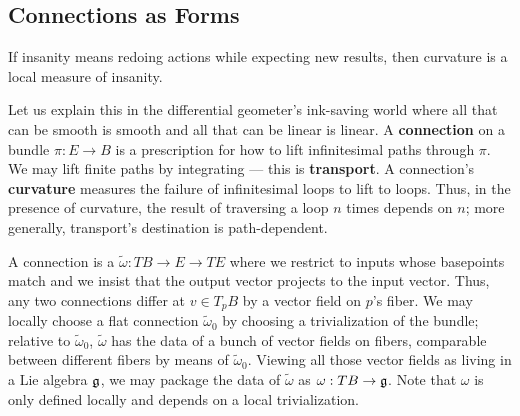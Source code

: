 \documentclass[twocolumn, 11pt]{article}
\newcommand{\gG}{\frak{g}}
\theoremstyle{definition}
\newcommand{\msec}[1]{\subsection*{\color{mblu}\textsf{#1}}}
\begin{document}

    \msec{Connections as Forms}
        If insanity means redoing actions while expecting new results, then
        curvature is a local measure of insanity.

        Let us explain this in the differential geometer's ink-saving world
        where all that can be smooth is smooth and all that can be linear is
        linear.
        A \textbf{connection} on a bundle $\pi:E\to B$ is a
        prescription for how to lift infinitesimal paths through $\pi$.  We may
        lift finite paths by integrating --- this is
        \textbf{transport}.  A connection's \textbf{curvature} measures the
        failure of infinitesimal loops to lift to loops.  Thus, in the presence
        of curvature, the result of traversing a loop $n$ times depends on $n$;
        more generally, transport's destination is path-dependent.

        A connection is a $\tilde\omega: TB \to E \to TE$ where we restrict to
        inputs whose basepoints match and we insist that the output vector
        projects to the input vector.
        Thus, any two connections differ at $v \in T_p B$ by a vector field  
        on $p$'s fiber.
        We may locally choose a flat connection $\tilde\omega_0$ by choosing a
        trivialization of the bundle; relative to $\tilde\omega_0$,
        $\tilde\omega$ has the data of a bunch of vector fields on fibers, 
        comparable between different fibers by means of $\tilde\omega_0$.
        Viewing all those vector fields as living in a Lie algebra $\gG$,
        we may package the data of $\tilde\omega$ as $\omega:TB \to \gG$.
        Note that $\omega$ is only defined locally and depends on a local
        trivialization.
\end{document}
